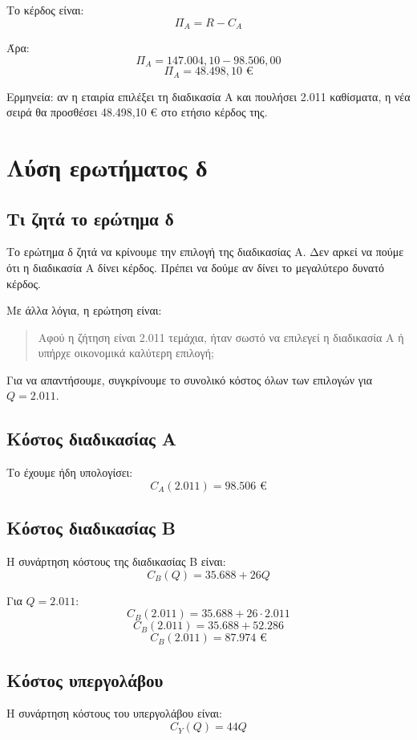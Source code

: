 \documentclass[12pt,a4paper]{article}
\begin{document}
Το κέρδος είναι:
\[
\Pi_A=R-C_A
\]

Άρα:
\[
\Pi_A=147.004{,}10-98.506{,}00
\]
\[
\boxed{\Pi_A=48.498{,}10 \text{ €}}
\]

Ερμηνεία: αν η εταιρία επιλέξει τη διαδικασία Α και πουλήσει 2.011 καθίσματα, η νέα σειρά θα προσθέσει 48.498,10 € στο ετήσιο κέρδος της.

\section{Λύση ερωτήματος δ}

\subsection{Τι ζητά το ερώτημα δ}

Το ερώτημα δ ζητά να κρίνουμε την επιλογή της διαδικασίας Α. Δεν αρκεί να πούμε ότι η διαδικασία Α δίνει κέρδος. Πρέπει να δούμε αν δίνει το μεγαλύτερο δυνατό κέρδος.

Με άλλα λόγια, η ερώτηση είναι:

\begin{quote}
Αφού η ζήτηση είναι 2.011 τεμάχια, ήταν σωστό να επιλεγεί η διαδικασία Α ή υπήρχε οικονομικά καλύτερη επιλογή;
\end{quote}

Για να απαντήσουμε, συγκρίνουμε το συνολικό κόστος όλων των επιλογών για \(Q=2.011\).

\subsection{Κόστος διαδικασίας Α}

Το έχουμε ήδη υπολογίσει:
\[
C_A(2.011)=98.506 \text{ €}
\]

\subsection{Κόστος διαδικασίας Β}

Η συνάρτηση κόστους της διαδικασίας Β είναι:
\[
C_B(Q)=35.688+26Q
\]

Για \(Q=2.011\):
\[
C_B(2.011)=35.688+26\cdot2.011
\]
\[
C_B(2.011)=35.688+52.286
\]
\[
C_B(2.011)=87.974 \text{ €}
\]

\subsection{Κόστος υπεργολάβου}

Η συνάρτηση κόστους του υπεργολάβου είναι:
\[
C_Y(Q)=44Q
\]
\end{document}
